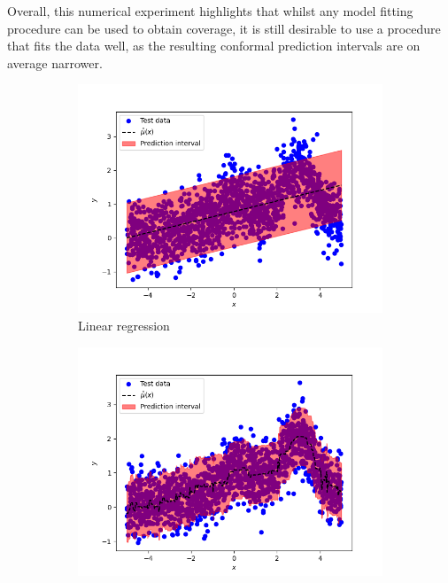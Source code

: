 \documentclass[11pt, titlepage]{article} %
\numberwithin{equation}{section}
\theoremstyle{definition}
\numberwithin{theorem}{section}
\numberwithin{lemma}{section}
\numberwithin{corollary}{section}
\numberwithin{proposition}{section}
\numberwithin{definition}{section}
\numberwithin{remark}{section}
\begin{document}
\noindent
Overall, this numerical experiment highlights that whilst any model fitting procedure can be used to obtain coverage, it is still desirable to use a procedure that fits the data well, as the resulting conformal prediction intervals are on average narrower.

\begin{figure}[H]
    \centering
    \begin{subfigure}{0.49\textwidth}
        \includegraphics[width=\linewidth]{figures/2_3_LR.png}    
        \caption{Linear regression} \label{fig:2_3_LR}
    \end{subfigure}
    \begin{subfigure}{0.49\textwidth}
        \includegraphics[width=\linewidth]{figures/2_3_RF.png}

\end{subfigure}
\end{figure}
\end{document}

